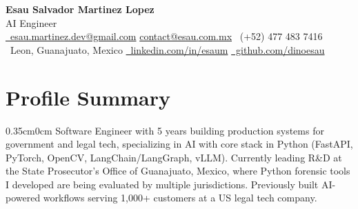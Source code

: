 \documentclass[a4paper, 10pt]{article}
\begin{document}
\begin{center}
  {\fontsize{20}{22}\selectfont\textbf{Esau Salvador Martinez Lopez}} \\[2pt]
  {\large AI Engineer} \\[6pt]
  {\small
    \href{mailto:esau.martinez.dev@gmail.com}{\faEnvelope\ esau.martinez.dev@gmail.com}
    \quad\textbar\quad
    \href{mailto:contact@esau.com.mx}{contact@esau.com.mx}
    \quad\textbar\quad
    \faPhone\ (+52) 477 483 7416
  } \\[2pt]
  {\small
    \faMapMarker*\ Leon, Guanajuato, Mexico
    \quad\textbar\quad
    \href{https://linkedin.com/in/esaum}{\faLinkedin\ linkedin.com/in/esaum}
    \quad\textbar\quad
    \href{https://github.com/dinoesau}{\faGithub\ github.com/dinoesau}
  }
\end{center}

\vspace{0.1cm}

\section{Profile Summary}
\begin{adjustwidth}{0.35cm}{0cm}
Software Engineer with 5 years building production systems for government and legal tech, specializing in AI with core stack in Python (FastAPI, PyTorch, OpenCV, LangChain/LangGraph, vLLM). Currently leading R\&D at the State Prosecutor's Office of Guanajuato, Mexico, where Python forensic tools I developed are being evaluated by multiple jurisdictions. Previously built AI-powered workflows serving 1,000+ customers at a US legal tech company.
\end{adjustwidth}
\end{document}
